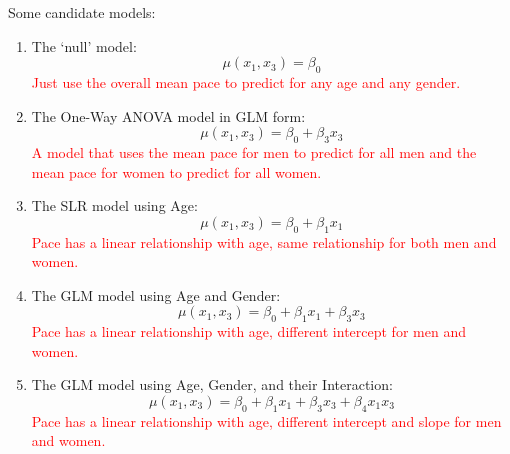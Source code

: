 Some candidate models:
\begin{enumerate}
\item The `null' model:
$$\mu(x_1,x_3) = \beta_0$$%
\textcolor{red}{Just use the overall mean pace to predict for any age and any gender.}
\item The One-Way ANOVA model in GLM form:
$$\mu(x_1,x_3) = \beta_0 + \beta_3 x_3$$%
\textcolor{red}{A model that uses the mean pace for men to predict for all men and the mean pace for women to predict for all women.}\\
\item The SLR model using Age:
$$\mu(x_1,x_3) = \beta_0 + \beta_1 x_1$$%
\textcolor{red}{Pace has a linear relationship with age, same relationship for both men and women.}\\
\item The GLM model using Age and Gender:
$$\mu(x_1,x_3) = \beta_0 + \beta_1 x_1 + \beta_3 x_3$$%
\textcolor{red}{Pace has a linear relationship with age, different intercept for men and women.}\\
\item The GLM model using Age, Gender, and their Interaction:
$$\mu(x_1,x_3) = \beta_0 + \beta_1 x_1 + \beta_3 x_3+\beta_4x_1x_3$$%
\textcolor{red}{Pace has a linear relationship with age, different intercept and slope for men and women.}

\newpage


\end{enumerate}
